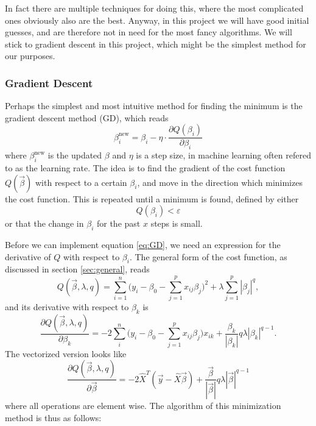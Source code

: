 In fact there are multiple techniques for doing this, where the most complicated ones obviously also are the best. Anyway, in this project we will have good initial guesses, and are therefore not in need for the most fancy algorithms. We will stick to gradient descent in this project, which might be the simplest method for our purposes.

\subsubsection{Gradient Descent} \label{sec:gd}
Perhaps the simplest and most intuitive method for finding the minimum is the gradient descent method (GD), which reads
\begin{equation}
\label{eq:GD}
\beta_i^{\text{new}}=\beta_i - \eta\cdot\frac{\partial Q(\beta_i)}{\partial\beta_i}
\end{equation}
where $\beta_i^{\text{new}}$ is the updated $\beta$ and $\eta$ is a step size, in machine learning often refered to as the learning rate. The idea is to find the gradient of the cost function $Q(\vec{\beta})$ with respect to a certain $\beta_i$, and move in the direction which minimizes the cost function. This is repeated until a minimum is found, defined by either
\begin{equation}
Q(\beta_i)<\varepsilon
\end{equation}
or that the change in $\beta_i$ for the past $x$ steps is small. 
\par 
\vspace{3mm}

Before we can implement equation \eqref{eq:GD}, we need an expression for the derivative of $Q$ with respect to $\beta_i$. The general form of the cost function, as discussed in section \ref{sec:general}, reads
\begin{equation}
Q(\vec{\beta},\lambda,q)=\sum_{i=1}^{n}\Big(y_i-\beta_0-\sum_{j=1}^px_{ij}\beta_j\Big)^2+\lambda\sum_{j=1}^p|\beta_j|^q,
\label{eq:cost_gen}
\end{equation}
and its derivative with respect to $\beta_k$ is
\begin{equation}
\frac{\partial Q(\vec{\beta},\lambda,q)}{\partial\beta_k}=-2\sum_i^n\Big(y_i-\beta_0-\sum_{j=1}^px_{ij}\beta_j\Big)x_{ik}+\frac{\beta_k}{|\beta_k|}q\lambda|\beta_k|^{q-1}.
\label{eq:der_cost_gen}
\end{equation}
The vectorized version looks like
\begin{equation}
\frac{\partial Q(\vec{\beta},\lambda,q)}{\partial\vec{\beta}}=-2\hat{X}^T(\vec{y}-\hat{X}\vec{\beta})+\frac{\vec{\beta}}{|\vec{\beta}|}q\lambda|\vec{\beta}|^{q-1}
\label{eq:der_cost_gen_vec}
\end{equation}
where all operations are element wise. The algorithm of this minimization method is thus as follows:

